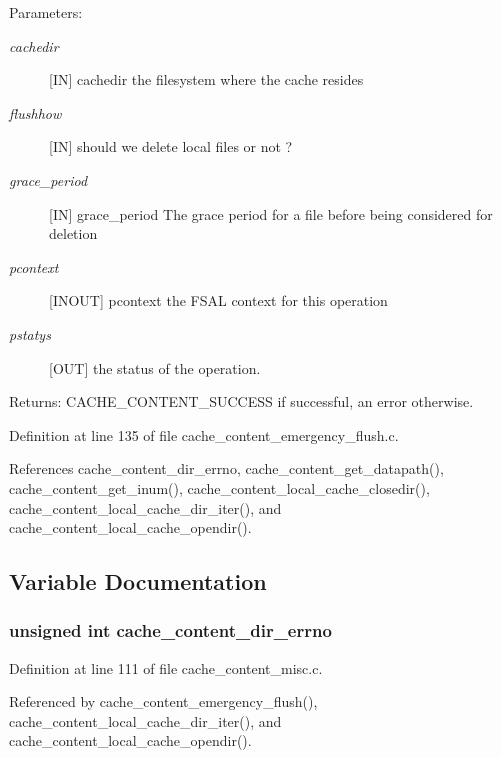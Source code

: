 \begin{Desc}
\item[Parameters:]
\begin{description}
\item[{\em cachedir}][IN] cachedir the filesystem where the cache resides \item[{\em flushhow}][IN] should we delete local files or not ? \item[{\em grace\_\-period}][IN] grace\_\-period The grace period for a file before being considered for deletion \item[{\em pcontext}][INOUT] pcontext the FSAL context for this operation \item[{\em pstatys}][OUT] the status of the operation.\end{description}
\end{Desc}
\begin{Desc}
\item[Returns:]CACHE\_\-CONTENT\_\-SUCCESS if successful, an error otherwise. \end{Desc}


Definition at line 135 of file cache\_\-content\_\-emergency\_\-flush.c.

References cache\_\-content\_\-dir\_\-errno, cache\_\-content\_\-get\_\-datapath(), cache\_\-content\_\-get\_\-inum(), cache\_\-content\_\-local\_\-cache\_\-closedir(), cache\_\-content\_\-local\_\-cache\_\-dir\_\-iter(), and cache\_\-content\_\-local\_\-cache\_\-opendir().

\subsection{Variable Documentation}
\subsubsection{\setlength{\rightskip}{0pt plus 5cm}unsigned int {\bf cache\_\-content\_\-dir\_\-errno}}\label{cache__content__emergency__flush_8c_a0}




Definition at line 111 of file cache\_\-content\_\-misc.c.

Referenced by cache\_\-content\_\-emergency\_\-flush(), cache\_\-content\_\-local\_\-cache\_\-dir\_\-iter(), and cache\_\-content\_\-local\_\-cache\_\-opendir().